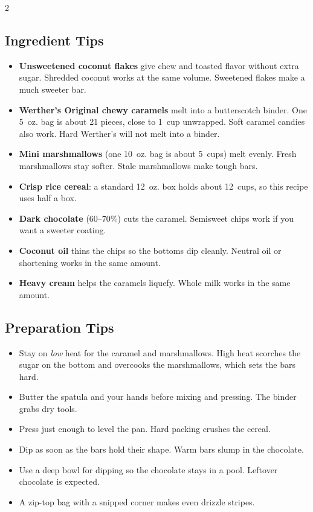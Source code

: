 \documentclass[11pt,letterpaper]{article}
\begin{document}
{\begin{multicols}{2}
\subsection*{Ingredient Tips}
\begin{itemize}
    \item \textbf{Unsweetened coconut flakes} give chew and toasted flavor without extra sugar. Shredded coconut works at the same volume. Sweetened flakes make a much sweeter bar.
    \item \textbf{Werther's Original chewy caramels} melt into a butterscotch binder. One 5~oz. bag is about 21 pieces, close to 1~cup unwrapped. Soft caramel candies also work. Hard Werther's will not melt into a binder.
    \item \textbf{Mini marshmallows} (one 10~oz. bag is about 5~cups) melt evenly. Fresh marshmallows stay softer. Stale marshmallows make tough bars.
    \item \textbf{Crisp rice cereal}: a standard 12~oz. box holds about 12~cups, so this recipe uses half a box.
    \item \textbf{Dark chocolate} (60--70\%) cuts the caramel. Semisweet chips work if you want a sweeter coating.
    \item \textbf{Coconut oil} thins the chips so the bottoms dip cleanly. Neutral oil or shortening works in the same amount.
    \item \textbf{Heavy cream} helps the caramels liquefy. Whole milk works in the same amount.
\end{itemize}

\subsection*{Preparation Tips}
\begin{itemize}
    \item Stay on \textit{low} heat for the caramel and marshmallows. High heat scorches the sugar on the bottom and overcooks the marshmallows, which sets the bars hard.
    \item Butter the spatula and your hands before mixing and pressing. The binder grabs dry tools.
    \item Press just enough to level the pan. Hard packing crushes the cereal.
    \item Dip as soon as the bars hold their shape. Warm bars slump in the chocolate.
    \item Use a deep bowl for dipping so the chocolate stays in a pool. Leftover chocolate is expected.
    \item A zip-top bag with a snipped corner makes even drizzle stripes.
\end{itemize}


\end{multicols}}
\end{document}
